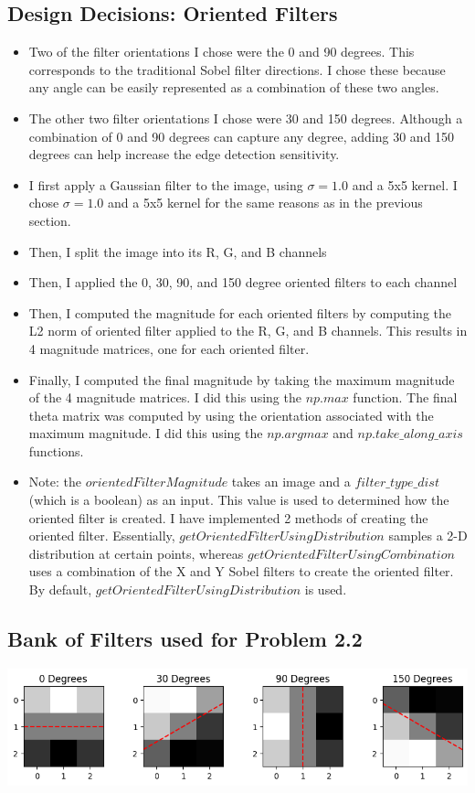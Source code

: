 \documentclass[12pt]{article}
\begin{document}
\subsection{Design Decisions: Oriented Filters}
\begin{itemize}
    \item Two of the filter orientations I chose were the 0 and 90 degrees. This corresponds to the traditional Sobel filter directions. I chose these because any angle can be easily represented as a combination of these two angles. 
    \item The other two filter orientations I chose were 30 and 150 degrees. Although a combination of 0 and 90 degrees can capture any degree, adding 30 and 150 degrees can help increase the edge detection sensitivity.
    \item I first apply a Gaussian filter to the image, using $\sigma = 1.0$ and a 5x5 kernel. I chose $\sigma = 1.0$ and a 5x5 kernel for the same reasons as in the previous section.
    \item Then, I split the image into its R, G, and B channels
    \item Then, I applied the 0, 30, 90, and 150 degree oriented filters to each channel
    \item Then, I computed the magnitude for each oriented filters by computing the L2 norm of oriented filter applied to the R, G, and B channels. This results in 4 magnitude matrices, one for each oriented filter.
    \item Finally, I computed the final magnitude by taking the maximum magnitude of the 4 magnitude matrices. I did this using the $np.max$ function. The final theta matrix was computed by using the orientation associated with the maximum magnitude. I did this using the $np.argmax$ and $np.take\_along\_axis$ functions.
    \item Note: the $orientedFilterMagnitude$ takes an image and a $filter\_type\_dist$ (which is a boolean) as an input. This value is used to determined how the oriented filter is created. I have implemented 2 methods of creating the oriented filter. Essentially, $getOrientedFilterUsingDistribution$ samples a 2-D distribution at certain points, whereas $getOrientedFilterUsingCombination$ uses a combination of the X and Y Sobel filters to create the oriented filter. By default, $getOrientedFilterUsingDistribution$ is used.
\end{itemize}

\subsection{Bank of Filters used for Problem 2.2}
\includegraphics[width=\textwidth]{images/FiltersBank.png}
\end{document}

